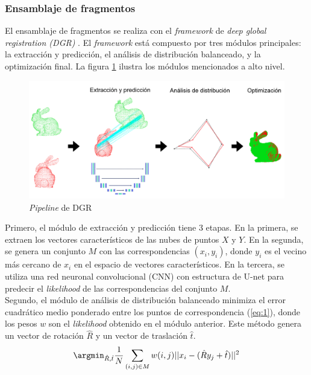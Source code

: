 \subsubsection{Ensamblaje de fragmentos}
El ensamblaje de fragmentos se realiza con el \textit{framework} de \textit{deep global registration (DGR)} \cite{10}. El \textit{framework} está compuesto por tres módulos principales: la extracción y predicción, el análisis de distribución balanceado, y la optimización final. La figura \ref{fig:dgr} ilustra los módulos mencionados a alto nivel.

\begin{figure}[!h]
    \centering
    \includegraphics[scale=0.31]{images/registration.png}
    \caption{\textit{Pipeline} de DGR}
    \label{fig:dgr}
\end{figure}


Primero, el módulo de extracción y predicción tiene 3 etapas. En la primera, se extraen los vectores característicos de las nubes de puntos $X$ y $Y$. En la segunda, se genera un conjunto $M$ con las correspondencias $(x_i, y_i)$, donde $y_i$ es el vecino más cercano de $x_i$ en el espacio de vectores característicos. En la tercera, se utiliza una red neuronal convolucional (CNN) con estructura de U-net para predecir el \textit{likelihood} de las correspondencias del conjunto $M$. \\
    
Segundo, el módulo de análisis de distribución balanceado minimiza el error cuadrático medio ponderado entre los puntos de correspondencia (\ref{eq:1}), donde los pesos $w$ son el \textit{likelihood} obtenido en el módulo anterior. Este método genera un vector de rotación $\hat{R}$ y un vector de traslación $\hat{t}$. \\
\begin{equation} \label{eq:1}
    \argmin_{\hat{R}, \hat{t}}\frac{1}{N}\sum_{(i, j) \in M} w(i,j) ||x_{i} - (\hat{R}y_{j} + \hat{t})||^{2}
\end{equation}
    
